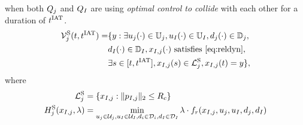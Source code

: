 when both $Q_{j}$ and $Q_{I}$ are using \textit{optimal control to collide} with each other for a duration of $t^\text{IAT}$. 
\begin{equation} \label{eqn:optAvoid}
\begin{aligned}
\brs^{\text{S}}_{j}(t, \iat) = & \{y: \exists \ctrl_j(\cdot) \in \cfset_j, \ctrl_\intr(\cdot) \in \cfset_\intr, \dstb_j(\cdot) \in \dfset_j, \\
& \dstb_\intr(\cdot) \in \dfset_\intr, \state_{\intr, j}(\cdot) \text{ satisfies \eqref{eq:reldyn}},\\
& \exists s \in [t, \iat], \state_{\intr, j}(s) \in \targetset^{\text{S}}_{j}, \state_{\intr, j}(t) = y\},
\end{aligned}
\end{equation}
where 
\begin{equation}
\begin{aligned}
\mathcal{L}^{\text{S}}_{j} &= \{x_{I, j}: \|p_{I, j}\|_2 \le R_c\} \\
H^{\text{S}}_{j}(x_{I, j}, \lambda) &= \min_{u_j \in \mathcal{U}_j, u_I \in \mathcal{U}_I, d_i \in \mathcal{D}_i, d_I \in \mathcal{D}_I} \lambda \cdot f_r(x_{I, j}, u_j, u_I, d_j, d_I)
\end{aligned}
\end{equation}